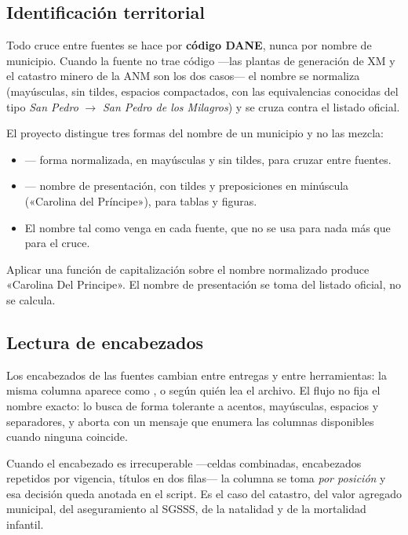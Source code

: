 \documentclass[11pt,a4paper]{article}
\begin{document}
\subsection{Identificación territorial}

Todo cruce entre fuentes se hace por \textbf{código DANE}, nunca por nombre de
municipio. Cuando la fuente no trae código —las plantas de generación de XM y el
catastro minero de la ANM son los dos casos— el nombre se normaliza (mayúsculas,
sin tildes, espacios compactados, con las equivalencias conocidas del tipo
\emph{San Pedro} $\to$ \emph{San Pedro de los Milagros}) y se cruza contra el
listado oficial.

El proyecto distingue tres formas del nombre de un municipio y no las mezcla:

\begin{itemize}[leftmargin=*, itemsep=2pt]
  \item {} — forma normalizada, en mayúsculas y sin tildes, para
    cruzar entre fuentes.
  \item {} — nombre de presentación, con tildes y preposiciones en
    minúscula («Carolina del Príncipe»), para tablas y figuras.
  \item El nombre tal como venga en cada fuente, que no se usa para nada más que
    para el cruce.
\end{itemize}

\begin{advertencia}[title={Por qué no se deriva el nombre de presentación}]
Aplicar una función de capitalización sobre el nombre normalizado produce
«Carolina Del Principe». El nombre de presentación se toma del listado oficial,
no se calcula.
\end{advertencia}

\subsection{Lectura de encabezados}

Los encabezados de las fuentes cambian entre entregas y entre herramientas: la
misma columna aparece como ,  o  según
quién lea el archivo. El flujo no fija el nombre exacto: lo busca de forma
tolerante a acentos, mayúsculas, espacios y separadores, y aborta con un mensaje
que enumera las columnas disponibles cuando ninguna coincide.

Cuando el encabezado es irrecuperable —celdas combinadas, encabezados repetidos
por vigencia, títulos en dos filas— la columna se toma \emph{por posición} y esa
decisión queda anotada en el script. Es el caso del catastro, del valor agregado
municipal, del aseguramiento al SGSSS, de la natalidad y de la mortalidad
infantil.
\end{document}
